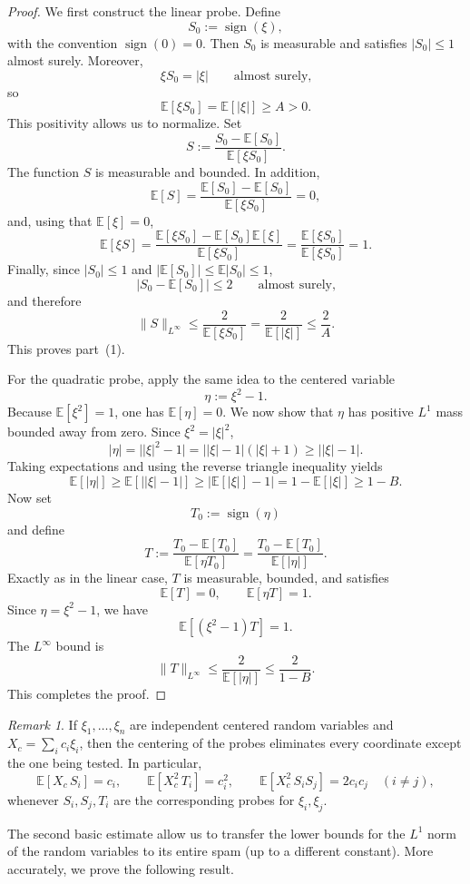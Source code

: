 \documentclass[11pt]{amsart}
\numberwithin{equation}{section}
\theoremstyle{definition}
\theoremstyle{remark}
\newtheorem{remark}[theorem]{Remark}
\newcommand{\E}{\mathbb E}
\newcommand{\sgn}{\operatorname{sign}}
\newcommand{\abs}[1]{\lvert #1 \rvert}
\newcommand{\norm}[1]{\lVert #1 \rVert}
\begin{document}
\begin{proof}
We first construct the linear probe.  Define
\[
S_0:=\sgn(\xi),
\]
with the convention $\sgn(0)=0$.  Then $S_0$ is measurable and satisfies
$|S_0|\le 1$ almost surely.  Moreover,
\[
\xi S_0=\abs{\xi}
\qquad\text{almost surely,}
\]
so
\[
\E[\xi S_0]=\E[\abs{\xi}]\ge A>0.
\]
This positivity allows us to normalize.  Set
\[
S:=\frac{S_0-\E[S_0]}{\E[\xi S_0]}.
\]
The function $S$ is measurable and bounded. In addition,
\[
\E[S]=\frac{\E[S_0]-\E[S_0]}{\E[\xi S_0]}=0,
\]
and, using that $\E[\xi]=0$,
\[
\E[\xi S]
=\frac{\E[\xi S_0]-\E[S_0]\E[\xi]}{\E[\xi S_0]}
=\frac{\E[\xi S_0]}{\E[\xi S_0]}
=1.
\]
Finally, since $|S_0|\le1$ and $|\E[S_0]|\le \E|S_0|\le1$,
\[
|S_0-\E[S_0]|\le 2
\qquad\text{almost surely,}
\]
and therefore
\[
\norm{S}_{L^\infty}
\le \frac{2}{\E[\xi S_0]}
=\frac{2}{\E[\abs{\xi}]}
\le \frac{2}{A}.
\]
This proves part~\rm(1).

For the quadratic probe, apply the same idea to the centered variable
\[
\eta:=\xi^2-1.
\]
Because $\E[\xi^2]=1$, one has $\E[\eta]=0$.  We now show that $\eta$ has
positive $L^1$ mass bounded away from zero.  Since $\xi^2=\abs{\xi}^2$,
\[
\abs{\eta}
=\abs{\abs{\xi}^2-1}
=\abs{\abs{\xi}-1}(\abs{\xi}+1)
\ge \abs{\abs{\xi}-1}.
\]
Taking expectations and using the reverse triangle inequality yields
\[
\E[\abs{\eta}]
\ge \E[\abs{\abs{\xi}-1}]
\ge \bigl|\E[\abs{\xi}]-1\bigr|
=1-\E[\abs{\xi}]
\ge 1-B.
\]
Now set
\[
T_0:=\sgn(\eta)
\]
and define
\[
T:=\frac{T_0-\E[T_0]}{\E[\eta T_0]}
=\frac{T_0-\E[T_0]}{\E[\abs{\eta}]}.
\]
Exactly as in the linear case, $T$ is measurable, bounded, and satisfies
\[
\E[T]=0,
\qquad
\E[\eta T]=1.
\]
Since $\eta=\xi^2-1$, we have
\[
\E[(\xi^2-1)T]=1.
\]
The $L^\infty$ bound is
\[
\norm{T}_{L^\infty}
\le \frac{2}{\E[\abs{\eta}]}
\le \frac{2}{1-B}.
\]
This completes the proof.
\end{proof}

\begin{remark}\label{rem:probe-extraction}
If $\xi_1,\dots,\xi_n$ are independent centered random variables and
$X_c=\sum_i c_i\xi_i$, then the centering of the probes eliminates every
coordinate except the one being tested.  In particular,
\[
\E[X_c\,S_i]=c_i,
\qquad
\E[X_c^2\,T_i]=c_i^2,
\qquad
\E[X_c^2\,S_iS_j]=2c_ic_j
\quad(i\ne j),
\]
whenever $S_i,S_j,T_i$ are the corresponding probes for $\xi_i,\xi_j$.
\end{remark}

The second basic estimate allow us to transfer the lower bounds for the $L^1$ norm of the random variables to its entire spam (up to a different constant). More accurately, we prove the following result.
\end{document}
